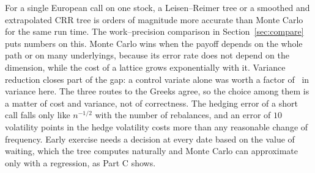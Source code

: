 For a single European call on one stock, a Leisen--Reimer tree or a smoothed and extrapolated CRR tree is orders of magnitude more accurate than Monte Carlo for the same run time.
The work--precision comparison in Section~\ref{sec:compare} puts numbers on this.
Monte Carlo wins when the payoff depends on the whole path or on many underlyings, because its error rate does not depend on the dimension, while the cost of a lattice grows exponentially with it.
Variance reduction closes part of the gap: a control variate alone was worth a factor of \VRcv\ in variance here.
The three routes to the Greeks agree, so the choice among them is a matter of cost and variance, not of correctness.
The hedging error of a short call falls only like $n^{-1/2}$ with the number of rebalances, and an error of $10$ volatility points in the hedge volatility costs more than any reasonable change of frequency.
Early exercise needs a decision at every date based on the value of waiting, which the tree computes naturally and Monte Carlo can approximate only with a regression, as Part C shows.
